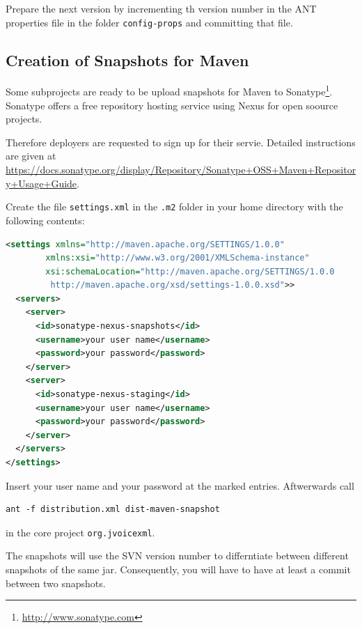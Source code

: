 \documentclass[11pt,a4paper]{article}
\begin{document}
Prepare the next version by incrementing th version number in the ANT
properties file in the folder \texttt{config-props} and committing that file.

\subsection{Creation of Snapshots for Maven}

Some subprojects are ready to be upload snapshots for Maven to
Sonatype\footnote{\url{http://www.sonatype.com}}. Sonatype offers
a free repository hosting service using Nexus for open soource projects.

Therefore deployers are requested to sign up for their servie. Detailed
instructions are given at \url{https://docs.sonatype.org/display/Repository/Sonatype+OSS+Maven+Repository+Usage+Guide}.

Create the file \texttt{settings.xml} in the \texttt{.m2} folder in your
home directory with the following contents:

\begin{lstlisting}[language=XML]
<settings xmlns="http://maven.apache.org/SETTINGS/1.0.0"
        xmlns:xsi="http://www.w3.org/2001/XMLSchema-instance"
        xsi:schemaLocation="http://maven.apache.org/SETTINGS/1.0.0
         http://maven.apache.org/xsd/settings-1.0.0.xsd">>
  <servers>
    <server>
      <id>sonatype-nexus-snapshots</id>
      <username>your user name</username>
      <password>your password</password>
    </server>
    <server>
      <id>sonatype-nexus-staging</id>
      <username>your user name</username>
      <password>your password</password>
    </server>
  </servers>
</settings>
\end{lstlisting}

Insert your user name and your password at the marked entries.
Aftwerwards call 
\begin{lstlisting}
ant -f distribution.xml dist-maven-snapshot
\end{lstlisting}
in the core project \lstinline{org.jvoicexml}.

The snapshots will use the SVN version number to differntiate between different
snapshots of the same jar. Consequently, you will have to have at least
a commit between two snapshots.


\end{document}
